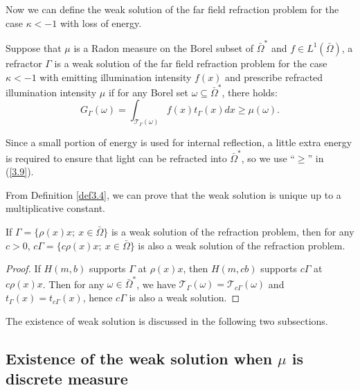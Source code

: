 \documentclass[a4paper,12pt,]{article}
\newtheorem{theorem}{\hskip\parindent\bf Theorem}[section]%
\newtheorem{remark}{\hskip\parindent\bf Remark}[section]%
\newtheorem{definition}{\hskip\parindent\bf Definition}[section]%
\numberwithin{equation}{section}
\numberwithin{equation}{section} \allowdisplaybreaks
\begin{document}
Now we can define the weak solution of the far field refraction problem for the case $\kappa <-1$ with loss of energy.
\begin{definition}
  Suppose that $\mu$ is a Radon measure on the Borel subset of $\bar{\Omega}^{\ast}$ and $f \in L^{1}(\bar{\Omega})$, a refractor $\Gamma$ is a weak solution of the far field refraction problem for the case $\kappa <-1$ with emitting illumination intensity $f(x)$ and prescribe refracted illumination intensity $\mu$ if for any Borel set $\omega \subseteq \bar{\Omega}^{\ast}$, there holds:
  \begin{equation}\label{3.9}
    G_{\Gamma}(\omega) = \int_{\mathcal{T}_{\Gamma}(\omega)}f(x)t_{\Gamma}(x)dx \geq \mu(\omega).
  \end{equation}
  \label{def3.4}
\end{definition}

\begin{remark}
  Since a small portion of energy is used for internal reflection, a little extra energy is required to ensure that light can be refracted into $\bar{\Omega}^{\ast}$, so we use ``$\geq$'' in (\ref{3.9}). 
\label{rem3.4}
\end{remark}

From Definition \ref{def3.4}, we can prove that the weak solution is unique up to a multiplicative constant.

\begin{theorem}
  If $\Gamma = \{\rho(x)x;~x\in \bar{\Omega}\}$ is a weak solution of the refraction problem, then for any $c>0$, $c\Gamma = \{c\rho(x)x;~x\in \bar{\Omega}\}$ is also a weak solution of the refraction problem.
  \label{thm3.2}
\end{theorem}

\begin{proof}
  If $H(m,b)$ supports $\Gamma$ at $\rho(x)x$, then $H(m,cb)$ supports $c\Gamma$ at $c\rho(x)x$. Then for any $\omega \in \bar{\Omega}^{\ast}$, we have $\mathcal{T}_{\Gamma}(\omega) = \mathcal{T}_{c\Gamma}(\omega)$ and $t_{\Gamma}(x) = t_{c\Gamma}(x)$, hence $c\Gamma$ is also a weak solution.
\end{proof}

The existence of weak solution is discussed in the following two subsections.

\subsection{Existence of the weak solution when $\mu$ is discrete measure}
\end{document}

